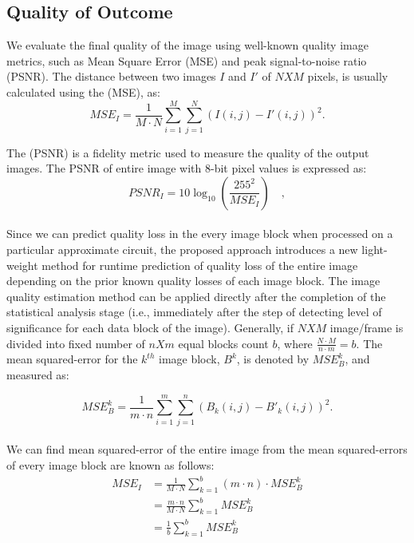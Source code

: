 \documentclass[journal]{IEEEtran}
\begin{document}
\subsection{Quality of Outcome}
We evaluate the final quality of the image using well-known quality image metrics, such as Mean Square Error (MSE) and peak signal-to-noise ratio (PSNR). The distance between two images $I$ and $I'$ of $N X M$ pixels, is usually calculated using the (MSE), as:\\
\begin{equation} \label{eq:2}
MSE_{I}=\frac{1}{M \cdot N}\sum_{i=1}^{M}\sum_{j=1}^{N}{\left ( I(i,j)-{I'(i,j)} \right )}^{2}.
\end{equation} 
 
The (PSNR) is a fidelity metric used to measure the quality of the output images. The PSNR of entire image with 8-bit pixel values is expressed as:
\begin{equation} \label{eq:3}
PSNR_{I}=10\log_{10}\left ( \frac{255^{2}}{MSE_{I}} \right )\quad,
\end{equation}\\
Since we can predict quality loss in the every image block when processed on a particular approximate circuit, the proposed approach introduces a new light-weight method for runtime prediction of quality loss of the entire image depending on the prior known quality losses of each image block. The image quality estimation method can be applied directly after the completion of the statistical analysis stage (i.e., immediately after the step of detecting level of significance for each data block of the image). Generally, if $N X M$ image/frame is divided into fixed number of $n X m$ equal blocks count $b$, where $\frac{N \cdot  M}{n \cdot m} = b$. The mean squared-error for the $k^{th}$ image block, $B^{k}$, is denoted by $MSE^{k}_{B}$, and measured as:

\begin{equation} \label{eq:4} 
MSE^{k}_{B} = \frac{1}{m \cdot n}\sum_{i=1}^{m}\sum_{j=1}^{n}{\left ( B_{k}(i,j)-{B'_{k}(i,j)} \right )}^{2}.
\end{equation}\\

We can find mean squared-error of the entire image from the mean squared-errors of  every image block are known as follows:
\begin{equation} \label{eq:5}
 \begin{split}
 MSE_{I} & =\frac{1}{M \cdot N}\sum_{k=1}^{b} \left ( m \cdot n \right ) \cdot MSE^{k}_{B}\\
 & =\frac{ m \cdot n }{M \cdot N}\sum_{k=1}^{b} MSE^{k}_{B} \\
 & = \frac{ 1 }{b} \sum_{k=1}^{b} MSE^{k}_{B} \\
 \end{split}
\end{equation}
\end{document}
